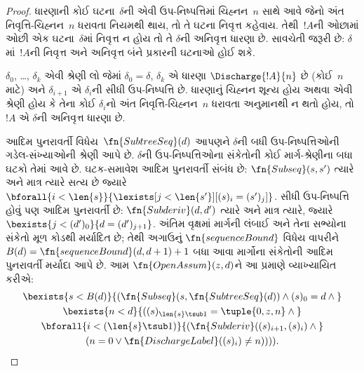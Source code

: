 \begin{proof}
  ધારણાની કોઈ ઘટના~$\delta$ની એવી
  ઉપ-નિષ્પત્તિમાં ચિહ્નન~$n$
  સાથે આવે જેનો અંત નિવૃત્તિ-ચિહ્નન~$n$
  ધરાવતા નિયમથી થાય, તો તે ઘટના
  નિવૃત્ત કહેવાય. તેથી~$!A$ની
  ઓછામાં ઓછી એક ઘટના~$\delta$માં
  નિવૃત્ત ન હોય તો તે
  $\delta$ની અનિવૃત્ત ધારણા છે.
  સાવચેતી જરૂરી છે: $\delta$માં~$!A$ની
  નિવૃત્ત અને
  અનિવૃત્ત બંને પ્રકારની
  ઘટનાઓ હોઈ શકે.

  $\delta_0$, \dots, $\delta_k$ એવી
  શ્રેણી લો જેમાં $\delta_0 =
  \delta$, $\delta_k$ એ ધારણા
  $\Discharge{!A}{n}$ છે (કોઈ~$n$
  માટે) અને $\delta_{i+1}$ એ
  $\delta_i$ની સીધી ઉપ-નિષ્પત્તિ
  છે. ધારણાનું ચિહ્નન શૂન્ય હોય અથવા એવી શ્રેણી
  હોય કે તેના કોઈ $\delta_i$નો અંત
  નિવૃત્તિ-ચિહ્નન~$n$ ધરાવતા
  અનુમાનથી ન થતો હોય, તો~$!A$ એ
  $\delta$ની અનિવૃત્ત
  ધારણા છે.

  આદિમ પુનરાવર્તી
  વિધેય~$\fn{SubtreeSeq}(d)$ આપણને
  $\delta$ની બધી ઉપ-નિષ્પત્તિઓની
  ગડેલ-સંખ્યાઓની શ્રેણી આપે છે.
  $\delta$ની ઉપ-નિષ્પત્તિઓના
  સંકેતોની કોઈ માર્ગ-શ્રેણીના બધા
  ઘટકો તેમાં આવે છે. ઘટક-સમાવેશ
  આદિમ પુનરાવર્તી સંબંધ છે:
  $\fn{Subseq}(s, s')$ ત્યારે અને
  માત્ર ત્યારે સત્ય છે જ્યારે
  $\bforall{i<\len{s}}{\lexists[j<\len{s'}][(s)_i = (s')_j]}$.
  સીધી ઉપ-નિષ્પત્તિ હોવું પણ
  આદિમ પુનરાવર્તી છે:
  $\fn{Subderiv}(d, d')$ ત્યારે અને
  માત્ર ત્યારે, જ્યારે
  $\bexists{j<(d')_0}{d = (d')_{j+1}}$.
  અંતિમ વૃક્ષમાં માર્ગની લંબાઈ અને
  તેના સભ્યોના સંકેતો મૂળ કોડથી
  મર્યાદિત છે; તેથી અગાઉનું
  $\fn{sequenceBound}$ વિધેય
  વાપરીને $B(d)=\fn{sequenceBound}(d,d+1)+1$
  બધા આવા માર્ગોના સંકેતોની
  આદિમ પુનરાવર્તી મર્યાદા આપે છે.
  આમ $\fn{OpenAssum}(z, d)$ને
  આ પ્રમાણે વ્યાખ્યાયિત કરીએ:
  \begin{multline*}
    \bexists{s<B(d)}{(\fn{Subseq}(s, \fn{SubtreeSeq}(d))
      \land (s)_0 = d \land {}} \\
    \bexists{n<d}{((s)_{\len{s} \tsub 1} = \tuple{0, z, n} \land {}}\\
      \bforall{i<(\len{s} \tsub 1)}{(\fn{Subderiv}((s)_{i+1}, (s)_i) \land {}}\\
      (n=0 \lor \fn{DischargeLabel}((s)_i) \neq n)))).
  \end{multline*}
\end{proof}


